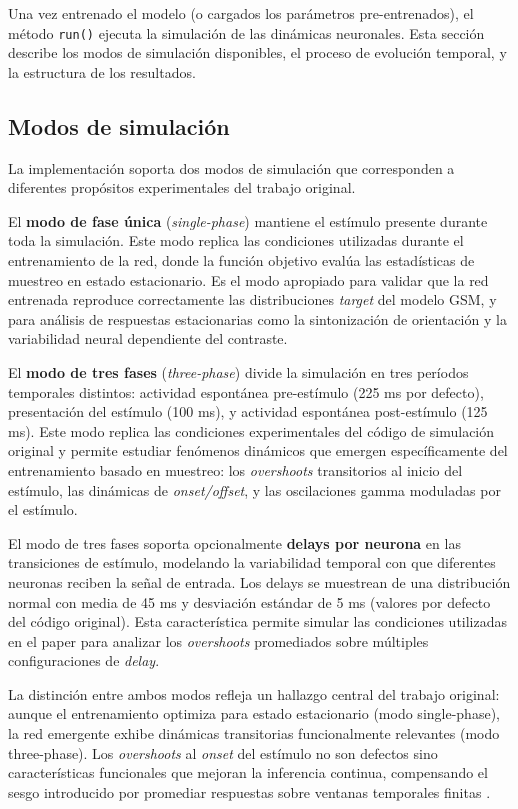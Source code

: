 Una vez entrenado el modelo (o cargados los parámetros pre-entrenados), el método \texttt{run()} ejecuta la simulación de las dinámicas neuronales. Esta sección describe los modos de simulación disponibles, el proceso de evolución temporal, y la estructura de los resultados.

\subsection{Modos de simulación}
\label{subsec:impl_modos}

La implementación soporta dos modos de simulación que corresponden a diferentes propósitos experimentales del trabajo original.

El \textbf{modo de fase única} (\textit{single-phase}) mantiene el estímulo presente durante toda la simulación. Este modo replica las condiciones utilizadas durante el entrenamiento de la red, donde la función objetivo evalúa las estadísticas de muestreo en estado estacionario. Es el modo apropiado para validar que la red entrenada reproduce correctamente las distribuciones \textit{target} del modelo \acrshort{GSM}, y para análisis de respuestas estacionarias como la sintonización de orientación y la variabilidad neural dependiente del contraste.

El \textbf{modo de tres fases} (\textit{three-phase}) divide la simulación en tres períodos temporales distintos: actividad espontánea pre-estímulo (225 ms por defecto), presentación del estímulo (100 ms), y actividad espontánea post-estímulo (125 ms). Este modo replica las condiciones experimentales del código de simulación original y permite estudiar fenómenos dinámicos que emergen específicamente del entrenamiento basado en muestreo: los \textit{overshoots} transitorios al inicio del estímulo, las dinámicas de \textit{onset/offset}, y las oscilaciones gamma moduladas por el estímulo.

El modo de tres fases soporta opcionalmente \textbf{delays por neurona} en las transiciones de estímulo, modelando la variabilidad temporal con que diferentes neuronas reciben la señal de entrada. Los delays se muestrean de una distribución normal con media de 45 ms y desviación estándar de 5 ms (valores por defecto del código original). Esta característica permite simular las condiciones utilizadas en el paper para analizar los \textit{overshoots} promediados sobre múltiples configuraciones de \textit{delay}.

La distinción entre ambos modos refleja un hallazgo central del trabajo original: aunque el entrenamiento optimiza para estado estacionario (modo single-phase), la red emergente exhibe dinámicas transitorias funcionalmente relevantes (modo three-phase). Los \textit{overshoots} al \textit{onset} del estímulo no son defectos sino características funcionales que mejoran la inferencia continua, compensando el sesgo introducido por promediar respuestas sobre ventanas temporales finitas \citep{echeveste2020cortical}.

